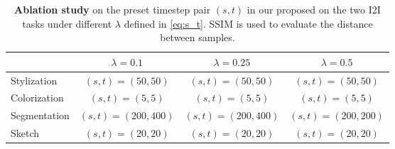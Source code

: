 \setlength{\tabcolsep}{10pt}
\begin{table*}[t]
\centering
\caption{
    \textbf{Ablation study} on the preset timestep pair $(s,t)$ in our proposed \method on the two I2I tasks under different $\lambda$ defined in \cref{eq:s_t}.
    SSIM is used to evaluate the distance between samples.
}
\label{tab:ablation_s_t}
\vspace{-2pt}
\begin{tabular}{l|ccc}
\toprule
             &      $\lambda=0.1$ &     $\lambda=0.25$ &      $\lambda=0.5$ \\
\midrule
 Stylization &   $(s,t)=(50, 50)$ &   $(s,t)=(50, 50)$ &   $(s,t)=(50, 50)$ \\
Colorization &      $(s,t)=(5,5)$ &      $(s,t)=(5,5)$      & $(s,t)=(5,5)$ \\
Segmentation & $(s,t)=(200, 400)$ & $(s,t)=(200, 400)$ & $(s,t)=(200, 200)$ \\
      Sketch &   $(s,t)=(20, 20)$ &   $(s,t)=(20, 20)$ &   $(s,t)=(20, 20)$ \\
\bottomrule
\end{tabular}
\end{table*}

